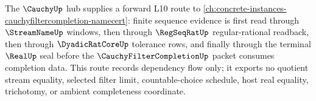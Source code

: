 The $\CauchyUp$ hub supplies a forward L10 route to \autoref{ch:concrete-instances-cauchyfiltercompletion-namecert}: finite sequence evidence is first read through $\StreamNameUp$ windows, then through $\RegSeqRatUp$ regular-rational readback, then through $\DyadicRatCoreUp$ tolerance rows, and finally through the terminal $\RealUp$ seal before the $\CauchyFilterCompletionUp$ packet consumes completion data. This route records dependency flow only; it exports no quotient stream equality, selected filter limit, countable-choice schedule, host real equality, trichotomy, or ambient completeness coordinate.
